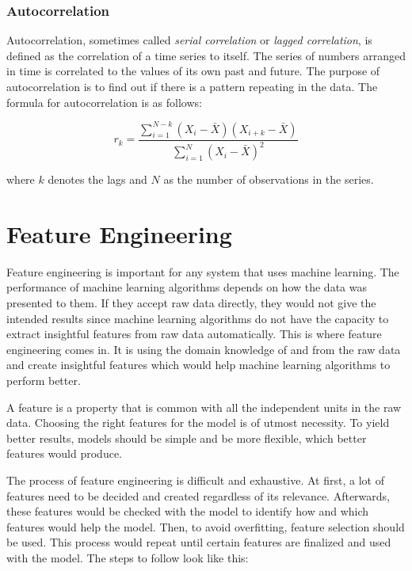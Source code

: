 \subsubsection{Autocorrelation}
Autocorrelation, sometimes called \textit{serial correlation} or \textit{lagged correlation}, is defined as the correlation of a time series to itself. The series of numbers arranged in time is correlated to the values of its own past and future. The purpose of autocorrelation is to find out if there is a pattern repeating in the data. The formula for autocorrelation is as follows: 

\begin{equation}
r_{k} = \frac{\sum_{i=1}^{N-k}(X_{i} - \bar{X})(X_{i+k} - \bar{X})} {\sum_{i=1}^{N}(X_{i} - \bar{X})^{2} }
\end{equation}

\noindent where $k$ denotes the lags and $N$ as the number of observations in the series.




\section{Feature Engineering}
Feature engineering is important for any system that uses machine learning. The performance of machine learning algorithms depends on how the data was presented to them. If they accept raw data directly, they would not give the intended results since machine learning algorithms do not have the capacity to extract insightful features from raw data automatically. This is where feature engineering comes in. It is using the domain knowledge of and from the raw data and create insightful features which would help machine learning algorithms to perform better. 

A feature is a property that is common with all the independent units in the raw data. Choosing the right features for the model is of utmost necessity. To yield better results, models should be simple and be more flexible, which better features would produce.

The process of feature engineering is difficult and exhaustive. At first, a lot of features need to be decided and created regardless of its relevance. Afterwards, these features would be checked with the model to identify how and which features would help the model. Then, to avoid overfitting, feature selection should be used. This process would repeat until certain features are finalized and used with the model. The steps to follow look like this:

